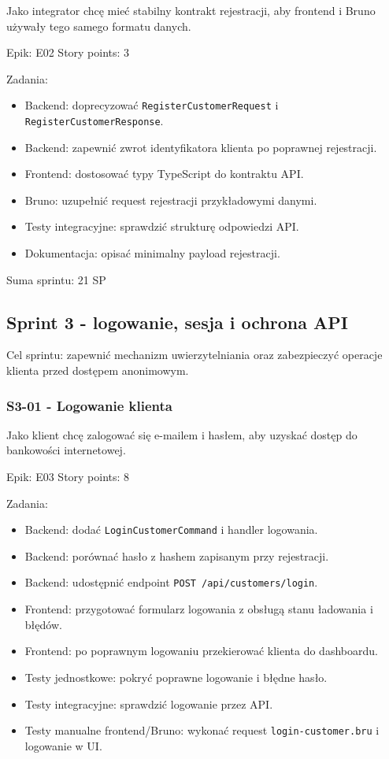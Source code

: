 \documentclass[12pt,a4paper]{article}
\begin{document}
Jako integrator chcę mieć stabilny kontrakt rejestracji, aby frontend i Bruno używały tego samego formatu danych.

Epik: E02
Story points: 3

Zadania:

\begin{itemize}
\item Backend: doprecyzować \texttt{RegisterCustomerRequest} i \texttt{RegisterCustomerResponse}.
\item Backend: zapewnić zwrot identyfikatora klienta po poprawnej rejestracji.
\item Frontend: dostosować typy TypeScript do kontraktu API.
\item Bruno: uzupełnić request rejestracji przykładowymi danymi.
\item Testy integracyjne: sprawdzić strukturę odpowiedzi API.
\item Dokumentacja: opisać minimalny payload rejestracji.
\end{itemize}

Suma sprintu: 21 SP

\subsection*{Sprint 3 - logowanie, sesja i ochrona API}

Cel sprintu: zapewnić mechanizm uwierzytelniania oraz zabezpieczyć operacje klienta przed dostępem anonimowym.

\subsubsection*{S3-01 - Logowanie klienta}

Jako klient chcę zalogować się e-mailem i hasłem, aby uzyskać dostęp do bankowości internetowej.

Epik: E03
Story points: 8

Zadania:

\begin{itemize}
\item Backend: dodać \texttt{LoginCustomerCommand} i handler logowania.
\item Backend: porównać hasło z hashem zapisanym przy rejestracji.
\item Backend: udostępnić endpoint \texttt{POST /api/customers/login}.
\item Frontend: przygotować formularz logowania z obsługą stanu ładowania i błędów.
\item Frontend: po poprawnym logowaniu przekierować klienta do dashboardu.
\item Testy jednostkowe: pokryć poprawne logowanie i błędne hasło.
\item Testy integracyjne: sprawdzić logowanie przez API.
\item Testy manualne frontend/Bruno: wykonać request \texttt{login-customer.bru} i logowanie w UI.
\end{itemize}
\end{document}
